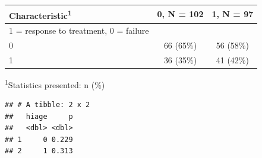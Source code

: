 \documentclass[]{book}
\newenvironment{Shaded}{\begin{snugshade}}{\end{snugshade}}
\newcommand{\CommentTok}[1]{\textcolor[rgb]{0.56,0.35,0.01}{\textit{#1}}}
\newcommand{\DataTypeTok}[1]{\textcolor[rgb]{0.13,0.29,0.53}{#1}}
\newcommand{\DecValTok}[1]{\textcolor[rgb]{0.00,0.00,0.81}{#1}}
\newcommand{\KeywordTok}[1]{\textcolor[rgb]{0.13,0.29,0.53}{\textbf{#1}}}
\newcommand{\NormalTok}[1]{#1}
\newcommand{\OperatorTok}[1]{\textcolor[rgb]{0.81,0.36,0.00}{\textbf{#1}}}
\newcommand{\OtherTok}[1]{\textcolor[rgb]{0.56,0.35,0.01}{#1}}
\newcommand{\StringTok}[1]{\textcolor[rgb]{0.31,0.60,0.02}{#1}}
\begin{document}
\begin{Shaded}
\end{Shaded}

\captionsetup[table]{labelformat=empty,skip=1pt}
\begin{longtable}{lcc}
\toprule
\textbf{Characteristic}\textsuperscript{1} & \textbf{0}, N = 102 & \textbf{1}, N = 97 \\ 
\midrule
1 = response to treatment, 0 = failure &  &  \\ 
0 & 66 (65\%) & 56 (58\%) \\ 
1 & 36 (35\%) & 41 (42\%) \\ 
\bottomrule
\end{longtable}
\vspace{-5mm}
\begin{minipage}{\linewidth}
\textsuperscript{1}Statistics presented: n (\%) \\ 
\end{minipage}

\begin{Shaded}
\end{Shaded}

\begin{verbatim}
## # A tibble: 2 x 2
##   hiage     p
##   <dbl> <dbl>
## 1     0 0.229
## 2     1 0.313
\end{verbatim}
\end{document}

